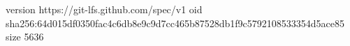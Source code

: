 version https://git-lfs.github.com/spec/v1
oid sha256:64d015df0350fac4c6db8e9c9d7cc465b87528db1f9c5792108533354d5ace85
size 5636
